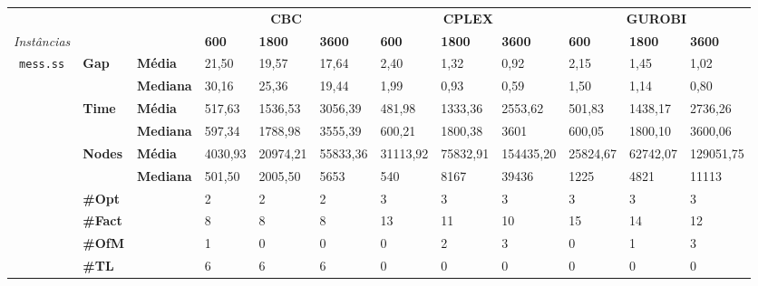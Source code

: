 
	\begin{footnotesize}	
	\caption{}
	\label{cflp:tab:4}
	\begin{tabular}{c@{\hskip 0.2cm}l@{\hskip 0.1cm}l|lll|lll|lll}
	& & & \multicolumn{3}{c}{\textbf{CBC}} & \multicolumn{3}{c}{\textbf{CPLEX}} & \multicolumn{3}{c}{\textbf{GUROBI}} 	\\\textit{Instâncias} & & & \textbf{600} & \textbf{1800} & \textbf{3600} & \textbf{600} & \textbf{1800} & \textbf{3600} & \textbf{600} & \textbf{1800} & \textbf{3600} \\
\hline
\multirow{7}{*}{\texttt{mess.ss}} & \multirow{2}{*}{\textbf{Gap}} & \textbf{Média} & 21,50 & 19,57 & 17,64 & 2,40 & 1,32 & 0,92 & 2,15 & 1,45 & 1,02 \\
 & & \textbf{Mediana} & 30,16 & 25,36 & 19,44 & 1,99 & 0,93 & 0,59 & 1,50 & 1,14 & 0,80 \\
\cline{2-12}
 & \multirow{2}{*}{\textbf{Time}} & \textbf{Média} & 517,63 & 1536,53 & 3056,39 & 481,98 & 1333,36 & 2553,62 & 501,83 & 1438,17 & 2736,26 \\
 & & \textbf{Mediana} & 597,34 & 1788,98 & 3555,39 & 600,21 & 1800,38 & 3601 & 600,05 & 1800,10 & 3600,06 \\
\cline{2-12}
 & \multirow{2}{*}{\textbf{Nodes}} & \textbf{Média} & 4030,93 & 20974,21 & 55833,36 & 31113,92 & 75832,91 & 154435,20 & 25824,67 & 62742,07 & 129051,75 \\
 & & \textbf{Mediana} & 501,50 & 2005,50 & 5653 & 540 & 8167 & 39436 & 1225 & 4821 & 11113 \\
\cline{2-12}
 & \textbf{\#Opt} & & 2 & 2 & 2 & 3 & 3 & 3 & 3 & 3 & 3 \\
 & \textbf{\#Fact} & & 8 & 8 & 8 & 13 & 11 & 10 & 15 & 14 & 12 \\
 & \textbf{\#OfM} & & 1 & 0 & 0 & 0 & 2 & 3 & 0 & 1 & 3 \\
 & \textbf{\#TL} & & 6 & 6 & 6 & 0 & 0 & 0 & 0 & 0 & 0 \\
	\end{tabular}
	\end{footnotesize}

